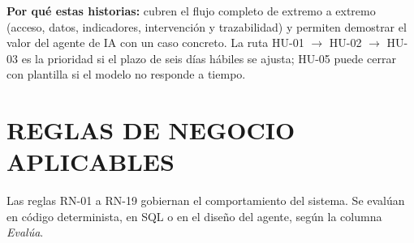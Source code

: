 \documentclass[11pt,a4paper]{article}
\begin{document}
\textbf{Por qué estas historias:} cubren el flujo completo de extremo a extremo (acceso, datos, indicadores, intervención y trazabilidad) y permiten demostrar el valor del agente de IA con un caso concreto. La ruta HU-01 $\rightarrow$ HU-02 $\rightarrow$ HU-03 es la prioridad si el plazo de seis días hábiles se ajusta; HU-05 puede cerrar con plantilla si el modelo no responde a tiempo.

\section{REGLAS DE NEGOCIO APLICABLES}

Las reglas RN-01 a RN-19 gobiernan el comportamiento del sistema. Se evalúan en código determinista, en SQL o en el diseño del agente, según la columna \emph{Evalúa}.
\end{document}
